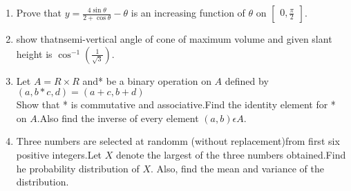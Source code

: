 \documentclass[12pt,-letter paper]{article}
\providecommand{\myvec}[1]{\ensuremath{\begin{bmatrix}#1\end{bmatrix}}}
\providecommand{\brak}[1]{\ensuremath{\left(#1\right)}}
\begin{document}
\begin{enumerate}
  \item Prove that $y=\frac{4\sin{\theta}}{2+\cos{\theta}}-\theta$ is an increasing function of $\theta$ on  $\myvec{0,\frac{\pi}{2}}$.

  \item  show thatnsemi-vertical angle of cone of maximum volume and given slant height is  $\cos^{-1}(\frac{1}{\sqrt{3}})$.
     
  \item Let $A=R\times R$ and* be a binary operation on $A$ defined by\\ $\brak{{a,b}*{c,d}}=\brak{a+c,b+d}$\\
	  Show that * is commutative and associative.Find the identity element for * on $A$.Also find the inverse of every element $\brak{a,b}\epsilon A$.

 
   \item Three numbers are selected at randomm (without replacement)from first six positive integers.Let $X$ denote the largest of the three numbers obtained.Find he probability distribution of $X$. Also, find the mean and variance of the distribution.

\end{enumerate}        
\end{document}
